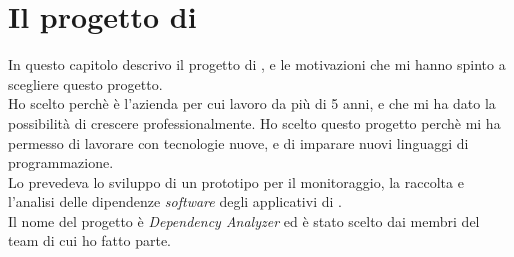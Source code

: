 \chapter{Il progetto di \stage}
\label{cap:ilprogettodistage}

In questo capitolo descrivo il progetto di \stage, e le motivazioni che mi hanno spinto a scegliere questo progetto.\\
Ho scelto {\azienda} perchè è l'azienda per cui lavoro da più di 5 anni, e che mi ha dato la possibilità di crescere professionalmente.
Ho scelto questo progetto perchè mi ha permesso di lavorare con tecnologie nuove, e di imparare nuovi linguaggi di programmazione.\\
Lo \stage{} prevedeva lo sviluppo di un prototipo per il monitoraggio, la raccolta e l'analisi delle dipendenze \textit{software} degli applicativi di {\azienda}.\\
Il nome del progetto è \textit{Dependency Analyzer} ed è stato scelto dai membri del team di cui ho fatto parte.\\






